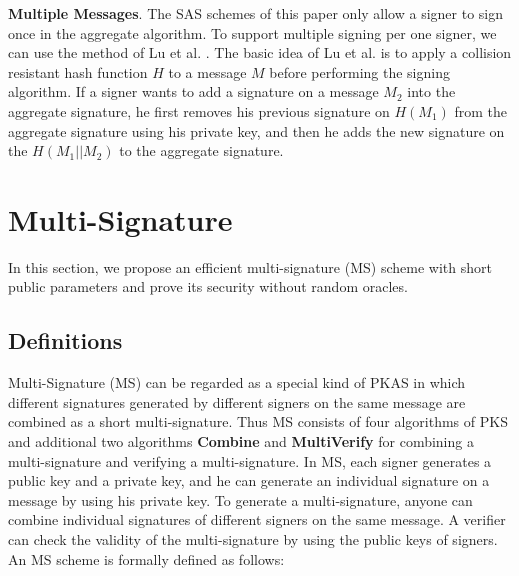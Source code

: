 \documentclass[11pt,letterpaper]{article}
\newcommand{\tb}[1]{\textbf{#1}}
\begin{document}
\noindent \textbf{Multiple Messages}. The SAS schemes of this paper only
allow a signer to sign once in the aggregate algorithm. To support multiple
signing per one signer, we can use the method of Lu et al. \cite{LuOSSW06}.
The basic idea of Lu et al. is to apply a collision resistant hash function
$H$ to a message $M$ before performing the signing algorithm. If a signer
wants to add a signature on a message $M_2$ into the aggregate signature, he
first removes his previous signature on $H(M_1)$ from the aggregate signature
using his private key, and then he adds the new signature on the
$H(M_1||M_2)$ to the aggregate signature.

\section{Multi-Signature} \label{sec:ms}

In this section, we propose an efficient multi-signature (MS) scheme with
short public parameters and prove its security without random oracles.

\subsection{Definitions}

Multi-Signature (MS) can be regarded as a special kind of PKAS in which
different signatures generated by different signers on the same message are
combined as a short multi-signature. Thus MS consists of four algorithms of
PKS and additional two algorithms \tb{Combine} and \tb{MultiVerify} for
combining a multi-signature and verifying a multi-signature. In MS, each
signer generates a public key and a private key, and he can generate an
individual signature on a message by using his private key. To generate a
multi-signature, anyone can combine individual signatures of different
signers on the same message. A verifier can check the validity of the
multi-signature by using the public keys of signers. An MS scheme is formally
defined as follows:
\end{document}
